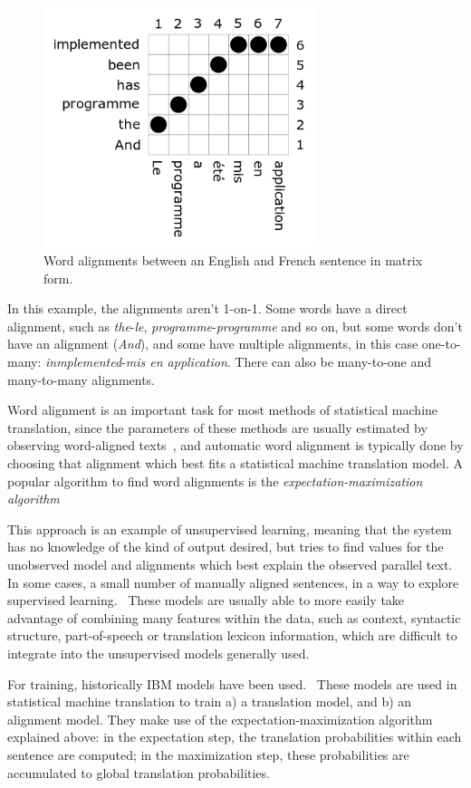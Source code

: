 \begin{figure}[!ht]
    \centering
    \includegraphics[width=8cm]{figures/word_align_matrix.png}
    \caption{Word alignments between an English and French sentence in matrix form.}
\end{figure}

In this example, the alignments aren't 1-on-1. Some words have a direct alignment, such as \emph{the}-\emph{le}, \emph{programme}-\emph{programme} and so on, but some words don't have an alignment (\emph{And}), and some have multiple alignments, in this case one-to-many: \emph{inmplemented}-\emph{mis en application}. There can also be many-to-one and many-to-many alignments.

Word alignment is an important task for most methods of statistical machine translation, since the parameters of these methods are usually estimated by observing word-aligned texts~\cite{brown1993mathematics}, and automatic word alignment is typically done by choosing that alignment which best fits a statistical machine translation model. A popular algorithm to find word alignments is the \emph{expectation-maximization algorithm}~\cite{och1999improved}

This approach is an example of unsupervised learning, meaning that the system has no knowledge of the kind of output desired, but tries to find values for the unobserved model and alignments which best explain the observed parallel text. In some cases, a small number of manually aligned sentences, in a way to explore supervised learning.~\cite{varga2007parallel} These models are usually able to more easily take advantage of combining many features within the data, such as context, syntactic structure, part-of-speech or translation lexicon information, which are difficult to integrate into the unsupervised models generally used.

For training, historically IBM models have been used.~\cite{koehn2009statistical} These models are used in statistical machine translation to train a) a translation model, and b) an alignment model. They make use of the expectation-maximization algorithm explained above: in the expectation step, the translation probabilities within each sentence are computed; in the maximization step, these probabilities are accumulated to global translation probabilities.